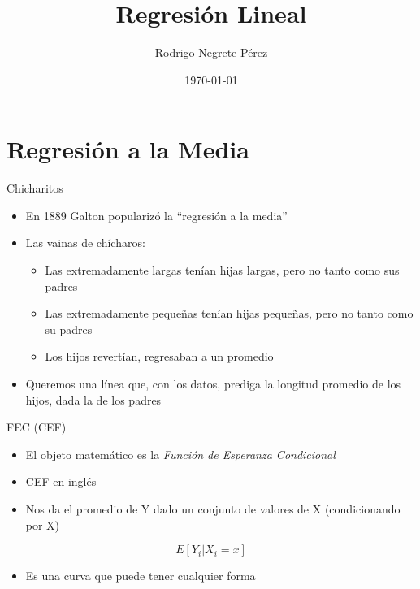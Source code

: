 \documentclass[
  ignorenonframetext,
]{beamer}
\title{Regresión Lineal}
\author{Rodrigo Negrete Pérez}
\date{\today}
\providecommand{\tightlist}{%
  \setlength{\itemsep}{0pt}\setlength{\parskip}{0pt}}
\begin{document}
\frame{\titlepage}

\begin{frame}[allowframebreaks]
  \tableofcontents[hideallsubsections]
\end{frame}
\hypertarget{regresiuxf3n-a-la-media}{%
\section{Regresión a la Media}\label{regresiuxf3n-a-la-media}}

\begin{frame}{Chicharitos}
\protect\hypertarget{chicharitos}{}
\begin{itemize}
\tightlist
\item
  En 1889 Galton popularizó la ``regresión a la media''
\item
  Las vainas de chícharos:

  \begin{itemize}
  \tightlist
  \item
    Las extremadamente largas tenían hijas largas, pero no tanto como
    sus padres
  \item
    Las extremadamente pequeñas tenían hijas pequeñas, pero no tanto
    como su padres
  \item
    Los hijos revertían, regresaban a un promedio
  \end{itemize}
\item
  Queremos una línea que, con los datos, prediga la longitud promedio de
  los hijos, dada la de los padres
\end{itemize}
\end{frame}

\begin{frame}{FEC (CEF)}
\protect\hypertarget{fec-cef}{}
\begin{itemize}
\tightlist
\item
  El objeto matemático es la \emph{Función de Esperanza Condicional}
\item
  CEF en inglés
\item
  Nos da el promedio de Y dado un conjunto de valores de X
  (condicionando por X)
\end{itemize}

\[E[Y_i | X_i=x] \]

\begin{itemize}
\tightlist
\item
  Es una curva que puede tener cualquier forma
\end{itemize}
\end{frame}
\end{document}
